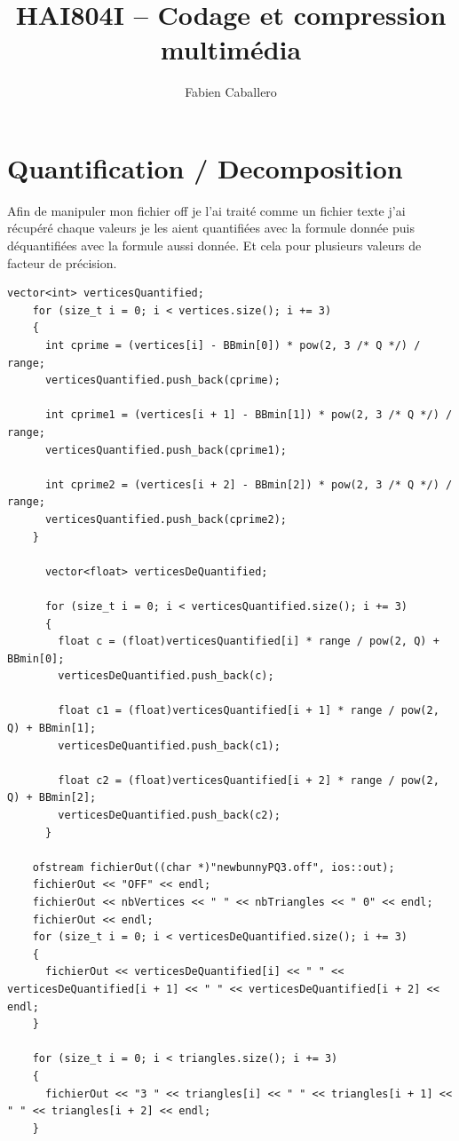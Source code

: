 \documentclass{article}
\title{HAI804I – Codage et compression multimédia
}
\author{Fabien Caballero}
\begin{document}
\maketitle
    \tableofcontents

\newpage

\section{Quantification / Decomposition}

Afin de manipuler mon fichier off je l'ai traité comme un fichier texte j'ai récupéré chaque valeurs je les aient quantifiées avec la formule donnée puis déquantifiées avec la formule aussi donnée.
Et cela pour plusieurs valeurs de facteur de précision.
\begin{lstlisting}
vector<int> verticesQuantified;
    for (size_t i = 0; i < vertices.size(); i += 3)
    {
      int cprime = (vertices[i] - BBmin[0]) * pow(2, 3 /* Q */) / range;
      verticesQuantified.push_back(cprime);

      int cprime1 = (vertices[i + 1] - BBmin[1]) * pow(2, 3 /* Q */) / range;
      verticesQuantified.push_back(cprime1);

      int cprime2 = (vertices[i + 2] - BBmin[2]) * pow(2, 3 /* Q */) / range;
      verticesQuantified.push_back(cprime2);
    }

      vector<float> verticesDeQuantified;

      for (size_t i = 0; i < verticesQuantified.size(); i += 3)
      {
        float c = (float)verticesQuantified[i] * range / pow(2, Q) + BBmin[0];
        verticesDeQuantified.push_back(c);

        float c1 = (float)verticesQuantified[i + 1] * range / pow(2, Q) + BBmin[1];
        verticesDeQuantified.push_back(c1);

        float c2 = (float)verticesQuantified[i + 2] * range / pow(2, Q) + BBmin[2];
        verticesDeQuantified.push_back(c2);
      }

    ofstream fichierOut((char *)"newbunnyPQ3.off", ios::out);
    fichierOut << "OFF" << endl;
    fichierOut << nbVertices << " " << nbTriangles << " 0" << endl;
    fichierOut << endl;
    for (size_t i = 0; i < verticesDeQuantified.size(); i += 3)
    {
      fichierOut << verticesDeQuantified[i] << " " << verticesDeQuantified[i + 1] << " " << verticesDeQuantified[i + 2] << endl;
    }

    for (size_t i = 0; i < triangles.size(); i += 3)
    {
      fichierOut << "3 " << triangles[i] << " " << triangles[i + 1] << " " << triangles[i + 2] << endl;
    }
\end{lstlisting}
\end{document}
